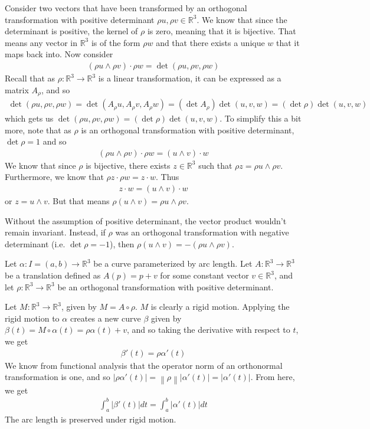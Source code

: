 \documentclass{article}
\newcommand{\norm}[1]{\left\lVert#1\right\rVert}
\newcommand{\R}{\mathbb{R}}
\begin{document}
	Consider two vectors that have been transformed by an orthogonal transformation with positive determinant $\rho u, \rho v \in \R^3$. We know that since the determinant is positive, the kernel of $\rho$ is zero, meaning that it is bijective. That means any vector in $\R^3$ is of the form $\rho w$ and that there exists a unique $w$ that it maps back into. Now consider
	\begin{gather*}
		(\rho u \wedge \rho v) \cdot \rho w = \det (\rho u, \rho v, \rho w)
	\end{gather*}
	Recall that as $\rho : \R^3 \to \R^3$ is a linear transformation, it can be expressed as a matrix $A_{\rho}$, and so
	\begin{gather*}
		\det (\rho u, \rho v, \rho w) = \det (A_{\rho} u, A_{\rho} v, A_{\rho} w) = (\det A_{\rho}) \det(u, v, w) = (\det \rho) \det(u, v, w)
	\end{gather*}
	which gets us $\det (\rho u, \rho v, \rho w) = (\det \rho) \det(u, v, w)$. To simplify this a bit more, note that as $\rho$ is an orthogonal transformation with positive determinant, $\det \rho = 1$ and so
	\begin{gather*}
		(\rho u \wedge \rho v) \cdot \rho w = (u \wedge v) \cdot w
	\end{gather*}
	We know that since $\rho$ is bijective, there exists $z \in \R^3$ such that $\rho z = \rho u \wedge \rho v$. Furthermore, we know that $\rho z \cdot \rho w = z \cdot w$. Thus
	\begin{gather*}
		z \cdot w = (u \wedge v) \cdot w
	\end{gather*}
	or $z = u \wedge v$. But that means $\rho (u \wedge v) = \rho u \wedge \rho v$.
	
	Without the assumption of positive determinant, the vector product wouldn't remain invariant. Instead, if $\rho$ was an orthogonal transformation with negative determinant (i.e. $\det \rho = -1$), then $\rho (u \wedge v) = - (\rho u \wedge \rho v)$.
	
	Let $\alpha : I = (a, b) \to \R^3$ be a curve parameterized by arc length. Let $A : \R^3 \to \R^3$ be a translation defined as $A(p) = p + v$ for some constant vector $v \in \R^3$, and let $\rho : \R^3 \to \R^3$ be an orthogonal transformation with positive determinant.
	
	Let $M : \R^3 \to \R^3$, given by $M = A \circ \rho$. $M$ is clearly a rigid motion. Applying the rigid motion to $\alpha$ creates a new curve $\beta$ given by $\beta(t) = M \circ \alpha(t) = \rho \alpha(t) + v$, and so taking the derivative with respect to $t$, we get
	\begin{gather*}
		\beta'(t) = \rho \alpha'(t)
	\end{gather*}
	We know from functional analysis that the operator norm of an orthonormal transformation is one, and so $|\rho \alpha'(t)| = \norm{\rho} |\alpha'(t)| = |\alpha'(t)|$. From here, we get
	\begin{gather*}
		\int_a^b |\beta'(t)| dt = \int_a^b |\alpha'(t)| dt
	\end{gather*}
	The arc length is preserved under rigid motion.
	
\end{document}
